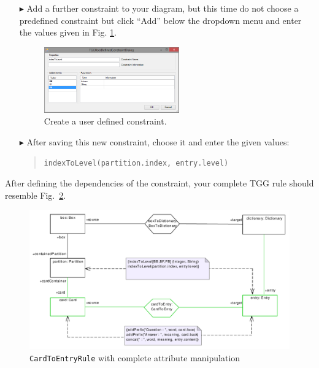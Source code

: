 \begin{enumerate}
\item[$\blacktriangleright$] Add a further constraint to your diagram, but this time do not choose a predefined constraint but click ``Add'' below the dropdown menu and enter the values given in Fig. \ref{fig:create_new_constraint}.

\begin{figure}[htbp]
\begin{center}
  \includegraphics[width=0.55\textwidth]{pics/tggBilder/tggRule/create_new_constraint}
  \caption{Create a user defined constraint.}
  \label{fig:create_new_constraint}
\end{center}
\end{figure}
\FloatBarrier

\item[$\blacktriangleright$] After saving this new constraint, choose it and enter the given values:

\begin{quotation}
\texttt{indexToLevel(partition.index, entry.level)}
\end{quotation}
\end{enumerate}

After defining the dependencies of the constraint, your complete TGG rule should resemble Fig.~\ref{fig:cardtoentry_complete}.
\begin{figure}[htbp]
\begin{center}
  \includegraphics[width=\textwidth]{pics/tggBilder/tggRule/tgg21}
  \caption{\texttt{CardToEntryRule} with complete attribute manipulation}
  \label{fig:cardtoentry_complete}
\end{center}
\end{figure}

